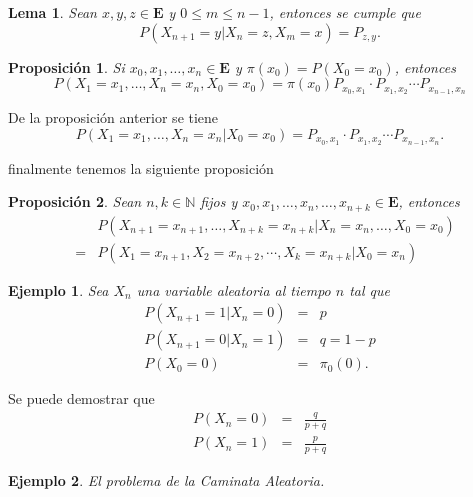\documentclass{article}
\newtheorem{Ejem}{Ejemplo}[section]
\newtheorem{Prop}{Proposición}[section]
\newtheorem{Lema}{Lema}[section]
\newcommand{\nat}{\mathbb{N}}
\newcommand{\Eb}{\mathbf{E}}
\numberwithin{equation}{section}
\begin{document}
\begin{Lema}
Sean $x,y,z\in\Eb$ y $0\leq m\leq n-1$, entonces se cumple que
\begin{equation}
P\left(X_{n+1}=y|X_{n}=z,X_{m}=x\right)=P_{z,y}.
\end{equation}
\end{Lema}


\begin{Prop}
Si $x_{0},x_{1},\ldots,x_{n}\in \Eb$ y $\pi\left(x_{0}\right)=P\left(X_{0}=x_{0}\right)$, entonces
\begin{equation}
P\left(X_{1}=x_{1},\ldots,X_{n}=x_{n},X_{0}=x_{0}\right)=\pi\left(x_{0}\right)P_{x_{0},x_{1}}\cdot P_{x_{1},x_{2}}\cdots P_{x_{n-1},x_{n}}
\end{equation}
\end{Prop}

De la proposici\'on anterior se tiene
\begin{equation}
P\left(X_{1}=x_{1},\ldots,X_{n}=x_{n}|X_{0}=x_{0}\right)=P_{x_{0},x_{1}}\cdot P_{x_{1},x_{2}}\cdots P_{x_{n-1},x_{n}}.
\end{equation}

finalmente tenemos la siguiente proposici\'on

\begin{Prop}
Sean $n,k\in\nat$ fijos y $x_{0},x_{1},\ldots,x_{n},\ldots,x_{n+k}\in\Eb$, entonces
\begin{eqnarray*}
&&P\left(X_{n+1}=x_{n+1},\ldots,X_{n+k}=x_{n+k}|X_{n}=x_{n},\ldots,X_{0}=x_{0}\right)\\
&=&P\left(X_{1}=x_{n+1},X_{2}=x_{n+2},\cdots,X_{k}=x_{n+k}|X_{0}=x_{n}\right)
\end{eqnarray*}
\end{Prop}


\begin{Ejem}
Sea $X_{n}$ una variable aleatoria al tiempo $n$ tal que
\begin{eqnarray}
P\left(X_{n+1}=1|X_{n}=0\right)&=&p\\
P\left(X_{n+1}=0|X_{n}=1\right)&=&q=1-p\\
P\left(X_{0}=0\right)&=&\pi_{0}\left(0\right).
\end{eqnarray}
\end{Ejem}
Se puede demostrar que
\begin{eqnarray}
P\left(X_{n}=0\right)&=&\frac{q}{p+q}\\
P\left(X_{n}=1\right)&=&\frac{p}{p+q}
\end{eqnarray}

\begin{Ejem}
El problema de la Caminata Aleatoria.
\end{Ejem}
\end{document}
